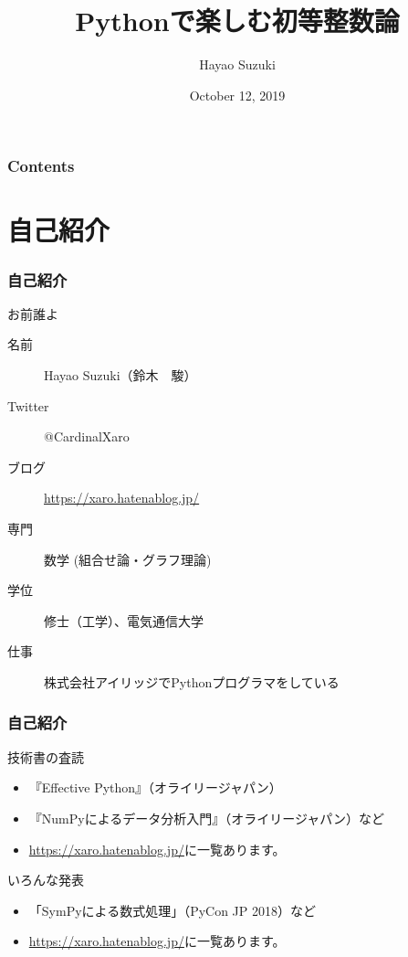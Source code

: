 \documentclass[dvipdfmx,11pt,notheorems]{beamer}
\title[Number Theory with Python]{Pythonで楽しむ初等整数論}
\author[Hayao]{Hayao Suzuki}
\institute[Hiroshima 2019]{PyCon mini Hiroshima 2019}
\date{October 12, 2019}
\theoremstyle{definition}
\begin{document}
\begin{frame}[plain]\frametitle{}
\titlepage %
\end{frame}

\begin{frame}\frametitle{Contents}
\tableofcontents %
\end{frame}

\section{自己紹介}

\begin{frame}\frametitle{自己紹介}

\begin{block}{お前誰よ}
\begin{description}
\item[名前] Hayao Suzuki（鈴木　駿）
\item[Twitter] @CardinalXaro
\item[ブログ] \url{https://xaro.hatenablog.jp/}
\item[専門] 数学 (組合せ論・グラフ理論)
\item[学位] 修士（工学）、電気通信大学
\item[仕事] 株式会社アイリッジでPythonプログラマをしている
\end{description}
\end{block}

\end{frame}

\begin{frame}\frametitle{自己紹介}

\begin{block}{技術書の査読}
\begin{itemize}
\item 『Effective Python』（オライリージャパン）
\item 『NumPyによるデータ分析入門』（オライリージャパン）など
\item \url{https://xaro.hatenablog.jp/}に一覧あります。
\end{itemize}
\end{block}

\begin{block}{いろんな発表}
\begin{itemize}
\item 「SymPyによる数式処理」（PyCon JP 2018）など
\item \url{https://xaro.hatenablog.jp/}に一覧あります。
\end{itemize}
\end{block}

\end{frame}
\end{document}
